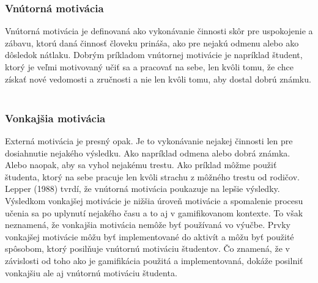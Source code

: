\documentclass[10pt,oneside,slovak,a4paper]{article}
\begin{document}
\subsubsection{Vnútorná motivácia} \label{vnutorna}
Vnútorná motivácia je definovaná ako vykonávanie činnosti skôr pre uspokojenie a zábavu, ktorú daná činnosť človeku prináša, ako pre nejakú odmenu alebo ako dôsledok nátlaku. Dobrým príkladom vnútornej motivácie je napríklad študent, ktorý je veľmi motivovaný učiť sa a pracovať na sebe, len kvôli tomu, že chce získať nové vedomosti a zručnosti a nie len kvôli tomu, aby dostal dobrú známku. ~\cite{ryan2000intrinsic}

\subsubsection{Vonkajšia motivácia} \label{vonkajsia}
Externá motivácia je presný opak. Je to vykonávanie nejakej činnosti len pre dosiahnutie nejakého výsledku. Ako napríklad odmena alebo dobrá známka. Alebo naopak, aby sa vyhol nejakému trestu. Ako príklad môžme použiť študenta, ktorý na sebe pracuje len kvôli strachu z môžného trestu od rodičov.
~\cite{ryan2000intrinsic}
Lepper (1988) tvrdí, že vnútorná motivácia poukazuje na lepšie výsledky. Výsledkom vonkajšej motivácie je nižšia úroveň motivácie a spomalenie procesu učenia sa po uplynutí nejakého času a to aj v gamifikovanom kontexte. To však neznamená, že vonkajšia motivácia nemôže byť používaná vo výučbe. Prvky vonkajšej motivácie môžu byť implementované do aktivít a môžu byť použité spôsobom, ktorý posilňuje vnútornú motiváciu študentov. Čo znamená, že v závislosti od toho ako je gamifikácia použitá a implementovaná, dokáže posilniť vonkajšiu ale aj vnútornú motiváciu študenta.
~\cite{garland2015gamification}







\end{document}
